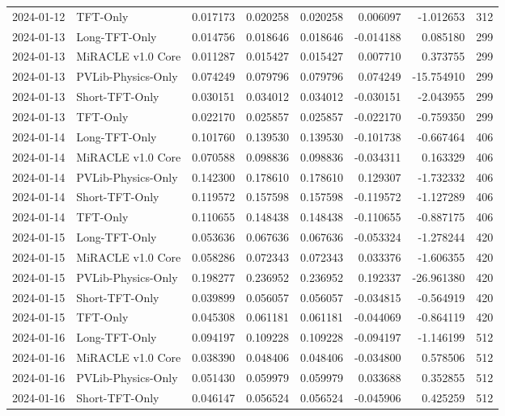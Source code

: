 \begin{tabular}{llrrrrrr}
2024-01-12 & TFT-Only & 0.017173 & 0.020258 & 0.020258 & 0.006097 & -1.012653 & 312 \\
2024-01-13 & Long-TFT-Only & 0.014756 & 0.018646 & 0.018646 & -0.014188 & 0.085180 & 299 \\
2024-01-13 & MiRACLE v1.0 Core & 0.011287 & 0.015427 & 0.015427 & 0.007710 & 0.373755 & 299 \\
2024-01-13 & PVLib-Physics-Only & 0.074249 & 0.079796 & 0.079796 & 0.074249 & -15.754910 & 299 \\
2024-01-13 & Short-TFT-Only & 0.030151 & 0.034012 & 0.034012 & -0.030151 & -2.043955 & 299 \\
2024-01-13 & TFT-Only & 0.022170 & 0.025857 & 0.025857 & -0.022170 & -0.759350 & 299 \\
2024-01-14 & Long-TFT-Only & 0.101760 & 0.139530 & 0.139530 & -0.101738 & -0.667464 & 406 \\
2024-01-14 & MiRACLE v1.0 Core & 0.070588 & 0.098836 & 0.098836 & -0.034311 & 0.163329 & 406 \\
2024-01-14 & PVLib-Physics-Only & 0.142300 & 0.178610 & 0.178610 & 0.129307 & -1.732332 & 406 \\
2024-01-14 & Short-TFT-Only & 0.119572 & 0.157598 & 0.157598 & -0.119572 & -1.127289 & 406 \\
2024-01-14 & TFT-Only & 0.110655 & 0.148438 & 0.148438 & -0.110655 & -0.887175 & 406 \\
2024-01-15 & Long-TFT-Only & 0.053636 & 0.067636 & 0.067636 & -0.053324 & -1.278244 & 420 \\
2024-01-15 & MiRACLE v1.0 Core & 0.058286 & 0.072343 & 0.072343 & 0.033376 & -1.606355 & 420 \\
2024-01-15 & PVLib-Physics-Only & 0.198277 & 0.236952 & 0.236952 & 0.192337 & -26.961380 & 420 \\
2024-01-15 & Short-TFT-Only & 0.039899 & 0.056057 & 0.056057 & -0.034815 & -0.564919 & 420 \\
2024-01-15 & TFT-Only & 0.045308 & 0.061181 & 0.061181 & -0.044069 & -0.864119 & 420 \\
2024-01-16 & Long-TFT-Only & 0.094197 & 0.109228 & 0.109228 & -0.094197 & -1.146199 & 512 \\
2024-01-16 & MiRACLE v1.0 Core & 0.038390 & 0.048406 & 0.048406 & -0.034800 & 0.578506 & 512 \\
2024-01-16 & PVLib-Physics-Only & 0.051430 & 0.059979 & 0.059979 & 0.033688 & 0.352855 & 512 \\
2024-01-16 & Short-TFT-Only & 0.046147 & 0.056524 & 0.056524 & -0.045906 & 0.425259 & 512 \\

\end{tabular}
